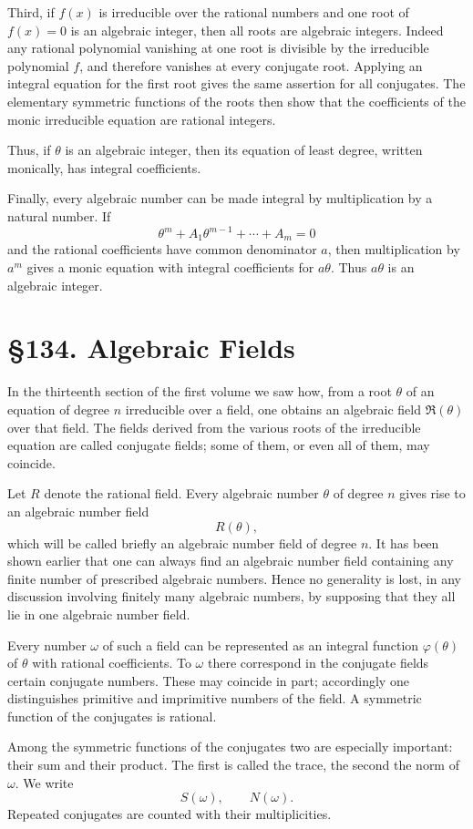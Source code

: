 \documentclass[12pt,a4paper]{article}
\newcommand{\webersection}[2]{\clearpage\section*{\S #1. #2}}
\newcommand{\R}{\mathfrak R}
\begin{document}
Third, if \(f(x)\) is irreducible over the rational numbers and one root of \(f(x)=0\) is an algebraic integer, then all roots are algebraic integers.  Indeed any rational polynomial vanishing at one root is divisible by the irreducible polynomial \(f\), and therefore vanishes at every conjugate root.  Applying an integral equation for the first root gives the same assertion for all conjugates.  The elementary symmetric functions of the roots then show that the coefficients of the monic irreducible equation are rational integers.

Thus, if \(\theta\) is an algebraic integer, then its equation of least degree, written monically, has integral coefficients.

Finally, every algebraic number can be made integral by multiplication by a natural number.  If
\[
 \theta^m+A_1\theta^{m-1}+\cdots+A_m=0
\]
and the rational coefficients have common denominator \(a\), then multiplication by \(a^m\) gives a monic equation with integral coefficients for \(a\theta\).  Thus \(a\theta\) is an algebraic integer.

\webersection{134}{Algebraic Fields}

In the thirteenth section of the first volume we saw how, from a root \(\theta\) of an equation of degree \(n\) irreducible over a field, one obtains an algebraic field \(\R(\theta)\) over that field.  The fields derived from the various roots of the irreducible equation are called conjugate fields; some of them, or even all of them, may coincide.

Let \(R\) denote the rational field.  Every algebraic number \(\theta\) of degree \(n\) gives rise to an algebraic number field
\[
 R(\theta),
\]
which will be called briefly an algebraic number field of degree \(n\).  It has been shown earlier that one can always find an algebraic number field containing any finite number of prescribed algebraic numbers.  Hence no generality is lost, in any discussion involving finitely many algebraic numbers, by supposing that they all lie in one algebraic number field.

Every number \(\omega\) of such a field can be represented as an integral function \(\varphi(\theta)\) of \(\theta\) with rational coefficients.  To \(\omega\) there correspond in the conjugate fields certain conjugate numbers.  These may coincide in part; accordingly one distinguishes primitive and imprimitive numbers of the field.  A symmetric function of the conjugates is rational.

Among the symmetric functions of the conjugates two are especially important: their sum and their product.  The first is called the trace, the second the norm of \(\omega\).  We write
\[
 S(\omega),
\qquad N(\omega).
\]
Repeated conjugates are counted with their multiplicities.
\end{document}
